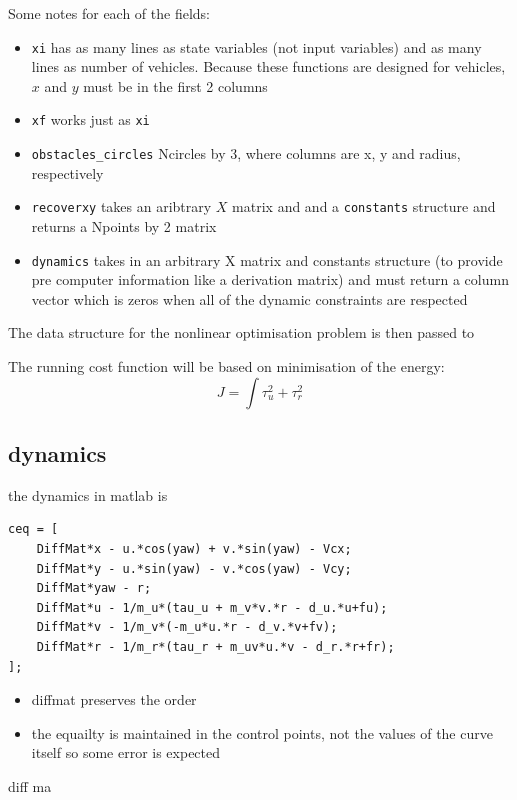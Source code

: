 \par Some notes for each of the fields:

\begin{itemize}
    \item \texttt{xi} has as many lines as state variables (not input variables) and as many lines as number of vehicles. Because these functions are designed for vehicles, $x$ and $y$ must be in the first 2 columns
    \item \texttt{xf} works just as \texttt{xi}
    \item \texttt{obstacles\_circles}  Ncircles by 3, where columns are x, y and radius, respectively
    \item \texttt{recoverxy} takes an aribtrary $X$ matrix and and a \texttt{constants} structure and returns a Npoints by 2 matrix
    \item \texttt{dynamics} takes in an arbitrary X matrix and constants structure (to provide pre computer information like a derivation matrix) and must return a column vector which is zeros when all of the dynamic constraints are respected
\end{itemize}

\par The data structure for the nonlinear optimisation problem is then passed to 

The running cost function will be based on minimisation of the energy:
\begin{equation}
    J = \int \tau_u^2 + \tau_r^2
\end{equation}

\subsection{dynamics}

the dynamics in matlab is 

\begin{lstlisting}[language=matlabfloz,caption={\mcode{Matlab Function}}]
ceq = [
    DiffMat*x - u.*cos(yaw) + v.*sin(yaw) - Vcx;
    DiffMat*y - u.*sin(yaw) - v.*cos(yaw) - Vcy;
    DiffMat*yaw - r;
    DiffMat*u - 1/m_u*(tau_u + m_v*v.*r - d_u.*u+fu);
    DiffMat*v - 1/m_v*(-m_u*u.*r - d_v.*v+fv);
    DiffMat*r - 1/m_r*(tau_r + m_uv*u.*v - d_r.*r+fr);
];
\end{lstlisting}

\begin{itemize}
    \item diffmat preserves the order
    \item the equailty is maintained in the control points, not the values of the curve itself so some error is expected
\end{itemize}
diff ma


